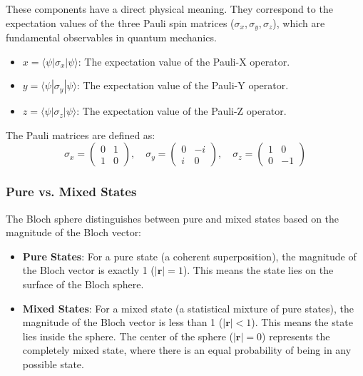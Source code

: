 \documentclass{article}
\begin{document}
 These components have a direct physical meaning. They correspond to the expectation values of the three Pauli spin matrices ($\sigma_x, \sigma_y, \sigma_z$), which are fundamental observables in quantum mechanics.
 \begin{itemize}
 	\item $x = \langle\psi|\sigma_x|\psi\rangle$: The expectation value of the Pauli-X operator.
 	\item $y = \langle\psi|\sigma_y|\psi\rangle$: The expectation value of the Pauli-Y operator.
 	\item $z = \langle\psi|\sigma_z|\psi\rangle$: The expectation value of the Pauli-Z operator.
 \end{itemize}
 The Pauli matrices are defined as:
 $$ \sigma_x = \begin{pmatrix} 0 & 1 \\ 1 & 0 \end{pmatrix}, \quad \sigma_y = \begin{pmatrix} 0 & -i \\ i & 0 \end{pmatrix}, \quad \sigma_z = \begin{pmatrix} 1 & 0 \\ 0 & -1 \end{pmatrix} $$
 
  
 \subsubsection*{Pure vs. Mixed States}
 
 The Bloch sphere distinguishes between pure and mixed states based on the magnitude of the Bloch vector:
 \begin{itemize}
 	\item \textbf{Pure States}: For a pure state (a coherent superposition), the magnitude of the Bloch vector is exactly 1 ($|\mathbf{r}| = 1$). This means the state lies on the surface of the Bloch sphere.
 	\item \textbf{Mixed States}: For a mixed state (a statistical mixture of pure states), the magnitude of the Bloch vector is less than 1 ($|\mathbf{r}| < 1$). This means the state lies inside the sphere. The center of the sphere ($|\mathbf{r}| = 0$) represents the completely mixed state, where there is an equal probability of being in any possible state.
 \end{itemize}
 
  
\end{document}
